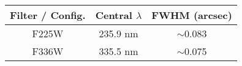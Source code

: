\documentclass[11pt,fleqn]{book} %
\begin{document}
																																																																																																																																																																																			    \begin{table}[h]
																																																																																																																																																																																			      \centering
																																																																																																																																																																																			          \begin{tabular}{ c c c }
																																																																																																																																																																																				      \hline\hline
																																																																																																																																																																																				          
																																																																																																																																																																																					      Filter / Config. & Central $\lambda$ & FWHM (arcsec)\\
																																																																																																																																																																																					          \hline
																																																																																																																																																																																						      
																																																																																																																																																																																						          F225W & 235.9 nm & $\sim$0.083\\
																																																																																																																																																																																							      
																																																																																																																																																																																							          F336W & 335.5 nm & $\sim$0.075\\
																																																																																																																																																																																								      

\end{tabular}
\end{table}
\end{document}
